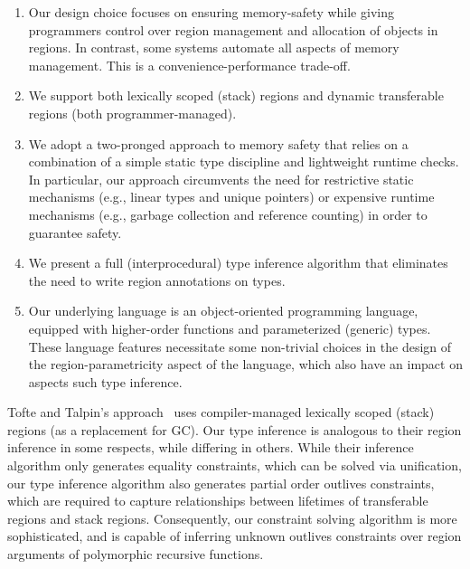 \begin{enumerate}
\item 
   Our design choice focuses on ensuring memory-safety while giving programmers
   control over  region management and allocation of objects in regions.
   In contrast, some systems automate all aspects of memory management.
   This is a convenience-performance trade-off.

\item We support both lexically scoped (stack) regions and dynamic transferable
regions (both programmer-managed).

\item We adopt a two-pronged approach to memory safety that relies on a
combination of a simple static type discipline and lightweight runtime
checks. In particular, our approach circumvents the need for restrictive
static mechanisms (e.g., linear types and unique pointers) or
expensive runtime mechanisms (e.g., garbage collection and reference
counting) in order to guarantee safety.

\item We present a full (interprocedural) type inference algorithm
that eliminates the need to write region annotations on types.

\item Our underlying language is an object-oriented programming language,
equipped with higher-order functions and parameterized (generic) types.
These language features necessitate some non-trivial choices in the design
of the region-parametricity aspect of the language, which also have an
impact on aspects such type inference.

\end{enumerate}

Tofte and Talpin's approach~\cite{tofte97} uses compiler-managed lexically
scoped (stack) regions (as a replacement for GC).
Our type inference is analogous to their region inference in some respects,
while differing in others. While their inference algorithm only generates equality constraints, which
can be solved via unification, our type inference algorithm also
generates partial order outlives constraints, which are required to
capture relationships between lifetimes of transferable regions
and stack regions. Consequently, our constraint solving algorithm is
more sophisticated, and is capable of inferring unknown outlives
constraints over region arguments of polymorphic recursive functions.

